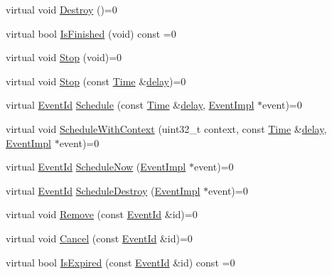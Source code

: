 \begin{DoxyCompactItemize}
\item 
virtual void \hyperlink{classns3_1_1SimulatorImpl_a421e634f3a4035941f00e72f367506fa}{Destroy} ()=0
\item 
virtual bool \hyperlink{classns3_1_1SimulatorImpl_afc1a8e4781155d6459fb2d25384b332f}{Is\+Finished} (void) const =0
\item 
virtual void \hyperlink{classns3_1_1SimulatorImpl_afbdfb2b01d0e62a7f681801f27820611}{Stop} (void)=0
\item 
virtual void \hyperlink{classns3_1_1SimulatorImpl_a8cd4ff5659b9f06af3da2897a1fea142}{Stop} (const \hyperlink{classns3_1_1Time}{Time} \&\hyperlink{mmwave_2model_2fading-traces_2fading__trace__generator_8m_a7964e6aa8f61a9d28973c8267a606ad8}{delay})=0
\item 
virtual \hyperlink{classns3_1_1EventId}{Event\+Id} \hyperlink{classns3_1_1SimulatorImpl_a24eac97ca7dc0e64162e3596064cfb5c}{Schedule} (const \hyperlink{classns3_1_1Time}{Time} \&\hyperlink{mmwave_2model_2fading-traces_2fading__trace__generator_8m_a7964e6aa8f61a9d28973c8267a606ad8}{delay}, \hyperlink{classns3_1_1EventImpl}{Event\+Impl} $\ast$event)=0
\item 
virtual void \hyperlink{classns3_1_1SimulatorImpl_a75a00f1362af7f641cc1467361201b13}{Schedule\+With\+Context} (uint32\+\_\+t context, const \hyperlink{classns3_1_1Time}{Time} \&\hyperlink{mmwave_2model_2fading-traces_2fading__trace__generator_8m_a7964e6aa8f61a9d28973c8267a606ad8}{delay}, \hyperlink{classns3_1_1EventImpl}{Event\+Impl} $\ast$event)=0
\item 
virtual \hyperlink{classns3_1_1EventId}{Event\+Id} \hyperlink{classns3_1_1SimulatorImpl_a9889e663af5245c5624c35611a9db948}{Schedule\+Now} (\hyperlink{classns3_1_1EventImpl}{Event\+Impl} $\ast$event)=0
\item 
virtual \hyperlink{classns3_1_1EventId}{Event\+Id} \hyperlink{classns3_1_1SimulatorImpl_a04f4a00ed04886ed0b9982038c3ed5f9}{Schedule\+Destroy} (\hyperlink{classns3_1_1EventImpl}{Event\+Impl} $\ast$event)=0
\item 
virtual void \hyperlink{classns3_1_1SimulatorImpl_a6456e1e88119250f07b589419acc775c}{Remove} (const \hyperlink{classns3_1_1EventId}{Event\+Id} \&id)=0
\item 
virtual void \hyperlink{classns3_1_1SimulatorImpl_ad117e616c99c915ddac6267a74804807}{Cancel} (const \hyperlink{classns3_1_1EventId}{Event\+Id} \&id)=0
\item 
virtual bool \hyperlink{classns3_1_1SimulatorImpl_a4b01ac397f5ce86997e9caec087f63d2}{Is\+Expired} (const \hyperlink{classns3_1_1EventId}{Event\+Id} \&id) const =0

\end{DoxyCompactItemize}
